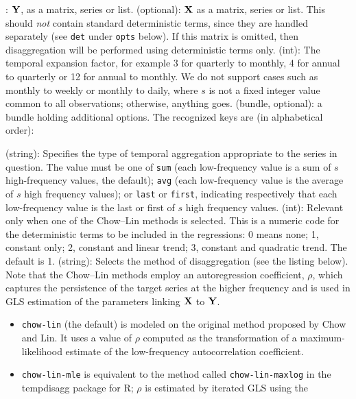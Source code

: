 \begin{description}
\tditem[Y0]: $\mathbf{Y}$, as a matrix, series or list.
\tditem[X](optional): $\mathbf{X}$ as a matrix, series or list.  This
  should \textit{not} contain standard deterministic terms, since they
  are handled separately (see \texttt{det} under \texttt{opts}
  below). If this matrix is omitted, then disaggregation will be
  performed using deterministic terms only.
\tditem[s](int): The temporal expansion factor, for example 3
  for quarterly to monthly, 4 for annual to quarterly or 12 for annual
  to monthly.  We do not support cases such as monthly to weekly or
  monthly to daily, where $s$ is not a fixed integer value common to
  all observations; otherwise, anything goes.
\tditem[opts](bundle, optional): a bundle holding additional
  options. The recognized keys are (in alphabetical order):
  \begin{description}
  \tditem[aggtype](string): Specifies the type of temporal
    aggregation appropriate to the series in question. The value must
    be one of \texttt{sum} (each low-frequency value is a sum of $s$
    high-frequency values, the default); \texttt{avg} (each
    low-frequency value is the average of $s$ high frequency values);
    or \texttt{last} or \texttt{first}, indicating respectively that
    each low-frequency value is the last or first of $s$ high
    frequency values.  \tditem[det](int): Relevant only when one of
    the Chow--Lin methods is selected. This is a numeric code for the
    deterministic terms to be included in the regressions: 0 means
    none; 1, constant only; 2, constant and linear trend; 3, constant
    and quadratic trend. The default is 1.
  \tditem[method](string): Selects the method of disaggregation (see
    the listing below). Note that the Chow--Lin methods employ an
    autoregression coefficient, $\rho$, which captures the persistence
    of the target series at the higher frequency and is used in GLS
    estimation of the parameters linking $\mathbf{X}$ to $\mathbf{Y}$.
    \begin{itemize}
    \item \texttt{chow-lin} (the default) is modeled on the original
      method proposed by Chow and Lin. It uses a value of $\rho$
      computed as the transformation of a maximum-likelihood estimate
      of the low-frequency autocorrelation coefficient.
    \item \texttt{chow-lin-mle} is equivalent to the method called
      \texttt{chow-lin-maxlog} in the \textsf{tempdisagg} package for
      \textsf{R}; $\rho$ is estimated by iterated GLS using the

\end{itemize}
\end{description}
\end{description}
